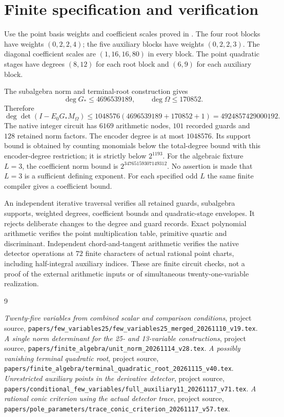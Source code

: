 \documentclass[11pt,a4paper]{article}
\begin{document}
\section{Finite specification and verification}
Use the point basis weights and coefficient scales proved in
\cite{FullAux}. The four root blocks have weights $(0,2,2,4)$;
the five auxiliary blocks have weights $(0,2,2,3)$. The diagonal
coefficient scales are $(1,16,16,80)$ in every block. The point
quadratic stages have degrees $(8,12)$ for each root block and
$(6,9)$ for each auxiliary block.

The subalgebra norm and terminal-root construction gives
\[
 \deg G_*\le4696539189,\qquad \deg\Omega\le170852.
\]
Therefore
\[
 \deg\det(I-E_0G_*M_\Omega)
 \le1048576(4696539189+170852+1)
 =4924857429000192.
\]
The native integer circuit has $6169$ arithmetic nodes, $101$
recorded guards and $128$ retained norm factors. The encoder degree
is at most $1048576$. Its support bound is obtained by counting
monomials below the total-degree bound with this encoder-degree
restriction; it is strictly below $2^{1193}$.
For the algebraic fixture $L=3$, the coefficient norm bound is
$2^{34765159307149312}$. No assertion is made that $L=3$ is
a sufficient defining exponent. For each specified odd $L$ the
same finite compiler gives a coefficient bound.

An independent iterative traversal verifies all retained guards,
subalgebra supports, weighted degrees, coefficient bounds and
quadratic-stage envelopes. It rejects deliberate changes to the
degree and guard records. Exact polynomial arithmetic verifies
the point multiplication table, primitive quartic and discriminant.
Independent chord-and-tangent arithmetic verifies the native
detector operations at $72$ finite characters of actual rational
point charts, including half-integral auxiliary indices. These
are finite circuit checks, not a proof of the external arithmetic
inputs or of simultaneous twenty-one-variable realization.

\begin{thebibliography}{9}\raggedright
{} \emph{Twenty-five variables from combined scalar and comparison conditions},
project source, \nolinkurl{papers/few_variables25/few_variables25_merged_20261110_v19.tex}.
 \emph{A single norm determinant for the 25- and 13-variable constructions},
project source, \nolinkurl{papers/finite_algebra/unit_norm_20261114_v28.tex}.
 \emph{A possibly vanishing terminal quadratic root},
project source, \nolinkurl{papers/finite_algebra/terminal_quadratic_root_20261115_v40.tex}.
 \emph{Unrestricted auxiliary points in the derivative detector},
project source, \nolinkurl{papers/conditional_few_variables/full_auxiliary11_20261117_v71.tex}.
 \emph{A rational conic criterion using the actual detector trace},
project source, \nolinkurl{papers/pole_parameters/trace_conic_criterion_20261117_v57.tex}.
\end{thebibliography}
\end{document}
